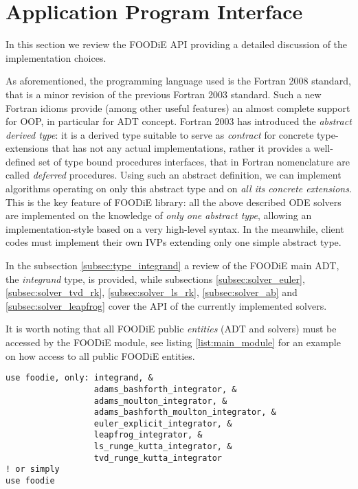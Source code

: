 \section{Application Program Interface}\label{sec:API}

In this section we review the FOODiE API providing a detailed discussion of the implementation choices.

As aforementioned, the programming language used is the Fortran 2008 standard, that is a minor revision of the previous Fortran 2003 standard. Such a new Fortran idioms provide (among other useful features) an almost complete support for OOP, in particular for ADT concept. Fortran 2003 has introduced the \emph{abstract derived type}: it is a derived type suitable to serve as \emph{contract} for concrete type-extensions that has not any actual implementations, rather it provides a well-defined set of type bound procedures interfaces, that in Fortran nomenclature are called \emph{deferred} procedures. Using such an abstract definition, we can implement algorithms operating on only this abstract type and on \emph{all its concrete extensions}. This is the key feature of FOODiE library: all the above described ODE solvers are implemented on the knowledge of \emph{only one abstract type}, allowing an implementation-style based on a very high-level syntax. In the meanwhile, client codes must implement their own IVPs extending only one simple abstract type.

In the subsection \ref{subsec:type_integrand} a review of the FOODiE main ADT, the \emph{integrand} type, is provided, while subsections \ref{subsec:solver_euler}, \ref{subsec:solver_tvd_rk}, \ref{subsec:solver_ls_rk}, \ref{subsec:solver_ab} and \ref{subsec:solver_leapfrog} cover the API of the currently implemented solvers.

It is worth noting that all FOODiE public \emph{entities} (ADT and solvers) must be accessed by the FOODiE module, see listing \ref{list:main_module} for an example on how access to all public FOODiE entities.

\begin{lstlisting}[firstnumber=1,style=code,caption={usage example importing all public entities of FOODiE main module},label={list:main_module}]
use foodie, only: integrand, &
                  adams_bashforth_integrator, &
                  adams_moulton_integrator, &
                  adams_bashforth_moulton_integrator, &
                  euler_explicit_integrator, &
                  leapfrog_integrator, &
                  ls_runge_kutta_integrator, &
                  tvd_runge_kutta_integrator
! or simply
use foodie
\end{lstlisting}

